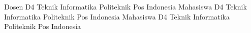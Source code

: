  Dosen D4 Teknik Informatika Politeknik Pos Indonesia
 Mahasiswa D4 Teknik Informatika Politeknik Pos Indonesia
 Mahasiswa D4 Teknik Informatika Politeknik Pos Indonesia



